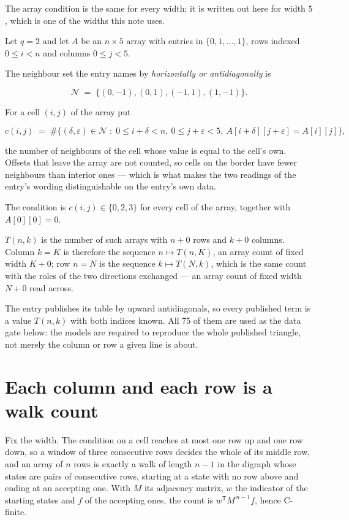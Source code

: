 \documentclass[11pt]{article}
\theoremstyle{definition}
\begin{document}
The array condition is the same for every width; it is written out here for width $5$, which is one of the widths this note uses.

Let $q = 2$ and let $A$ be an $n \times 5$ array with entries in $\{0,1,\dots,1\}$, rows indexed $0 \le i < n$ and columns $0 \le j < 5$.

The neighbour set the entry names by {\itshape horizontally or antidiagonally} is

\[\mathcal{N} \;=\; \{(0,-1), (0,1), (-1,1), (1,-1)\}.\]

For a cell $(i,j)$ of the array put

\[c(i,j) \;=\; \#\bigl\{(\delta,\varepsilon)\in\mathcal{N} \;:\; 0\le i+\delta<n,\ 0\le j+\varepsilon<5,\ A[i+\delta][j+\varepsilon] = A[i][j]\bigr\},\]

the number of neighbours of the cell whose value is equal to the cell's own. Offsets that leave the array are not counted, so cells on the border have fewer neighbours than interior ones --- which is what makes the two readings of the entry's wording distinguishable on the entry's own data.

The condition is $c(i,j) \in \{0, 2, 3\}$ for every cell of the array, together with $A[0][0]=0$.

$T(n,k)$ is the number of such arrays with $n + 0$ rows and $k + 0$ columns. Column $k = K$ is therefore the sequence $n \mapsto T(n,K)$, an array count of fixed width $K + 0$; row $n = N$ is the sequence $k \mapsto T(N,k)$, which is the same count with the roles of the two directions exchanged --- an array count of fixed width $N + 0$ read across.

The entry publishes its table by upward antidiagonals, so every published term is a value $T(n,k)$ with both indices known. All 75 of them are used as the data gate below: the models are required to reproduce the whole published triangle, not merely the column or row a given line is about.

\section{Each column and each row is a walk count}

Fix the width. The condition on a cell reaches at most one row up and one row down, so a window of three consecutive rows decides the whole of its middle row, and an array of $n$ rows is exactly a walk of length $n-1$ in the digraph whose states are pairs of consecutive rows, starting at a state with no row above and ending at an accepting one. With $M$ its adjacency matrix, $w$ the indicator of the starting states and $f$ of the accepting ones, the count is $w^{\mathsf T}M^{\,n-1}f$, hence C-finite.
\end{document}
